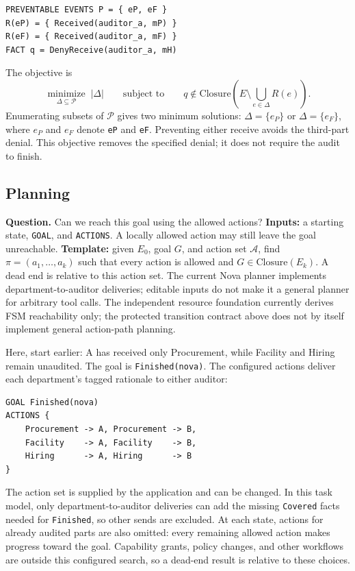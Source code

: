 \documentclass[10pt]{article}
\begin{document}
\begin{lstlisting}
PREVENTABLE EVENTS P = { eP, eF }
R(eP) = { Received(auditor_a, mP) }
R(eF) = { Received(auditor_a, mF) }
FACT q = DenyReceive(auditor_a, mH)
\end{lstlisting}

The objective is
\[
\underset{\Delta\subseteq\mathcal{P}}{\operatorname{minimize}}\; |\Delta|
\qquad\text{subject to}\qquad
q\notin\mathrm{Closure}\!\left(E\setminus\bigcup_{e\in\Delta}R(e)\right).
\]
Enumerating subsets of \(\mathcal{P}\) gives two minimum solutions:
\(\Delta=\{e_P\}\) or \(\Delta=\{e_F\}\), where \(e_P\) and \(e_F\) denote
\texttt{eP} and \texttt{eF}. Preventing either receive avoids the third-part denial.
This objective removes the specified denial; it does not require the audit to finish.

\subsection{Planning}

\textbf{Question.} Can we reach this goal using the allowed actions?
\textbf{Inputs:} a starting state, \texttt{GOAL}, and \texttt{ACTIONS}.
A locally allowed action may still leave the goal unreachable.
\textbf{Template:} given \(E_0\), goal \(G\), and action set \(\mathcal{A}\), find
\(\pi=(a_1,\ldots,a_k)\) such that every action is allowed and
\(G\in\mathrm{Closure}(E_k)\). A dead end is relative to this action set.
The current Nova planner implements department-to-auditor deliveries; editable inputs
do not make it a general planner for arbitrary tool calls. The independent resource
foundation currently derives FSM reachability only; the protected transition contract
above does not by itself implement general action-path planning.

Here, start earlier: A has received only Procurement, while Facility and Hiring remain
unaudited. The goal is \texttt{Finished(nova)}. The configured actions deliver each
department's tagged rationale to either auditor:

\begin{lstlisting}
GOAL Finished(nova)
ACTIONS {
    Procurement -> A, Procurement -> B,
    Facility    -> A, Facility    -> B,
    Hiring      -> A, Hiring      -> B
}
\end{lstlisting}

The action set is supplied by the application and can be changed. In this task model,
only department-to-auditor deliveries can add the missing \texttt{Covered} facts needed
for \texttt{Finished}, so other sends are excluded. At each state, actions for already
audited parts are also omitted: every remaining allowed action makes progress toward
the goal. Capability grants, policy changes, and other workflows are outside this
configured search, so a dead-end result is relative to these choices.
\end{document}
